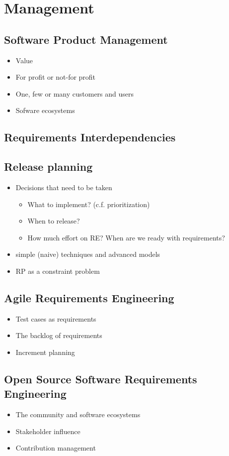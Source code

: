 
\chapter{Management}

\section{Software Product Management}

\begin{itemize}
  \item Value
  \item For profit or not-for profit
  \item One, few or many customers and users
  \item Sofware ecosystems
\end{itemize}

\section{Requirements Interdependencies}

\section{Release planning}

\begin{itemize}
  \item Decisions that need to be taken
  \begin{itemize}
    \item What to implement? (c.f. prioritization)
    \item When to release?
    \item How much effort on RE? When are we ready with requirements?
  \end{itemize}
  \item simple (naive) techniques and advanced models
  \item RP as a constraint problem
\end{itemize}

\section{Agile Requirements Engineering}

\begin{itemize}
  \item Test cases as requirements
  \item The backlog of requirements
  \item Increment planning
\end{itemize}


\section{Open Source Software Requirements Engineering}

\begin{itemize}
  \item The community and software ecosystems
  \item Stakeholder influence
  \item Contribution management
\end{itemize}
